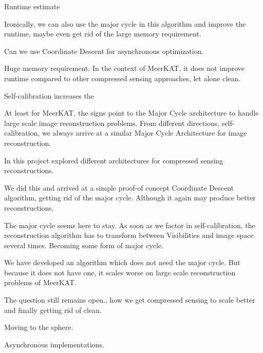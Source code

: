 Runtime estimate

Ironically, we can also use the major cycle in this algorithm and improve the runtime, maybe even get rid of the large memory requirement.

Can we use Coordinate Descent for asynchronous optimization.

Huge memory requirement. In the context of MeerKAT, it does not improve runtime compared to other compressed sensing approaches, let alone clean.

Self-calibration increases the 

At least for MeerKAT, the signs point to the Major Cycle architecture to handle large scale image reconstruction problems. From different directions, self-calibration, we always arrive at a similar Major Cycle Architecture for image reconstruction.






In this project explored different architectures for compressed sensing reconstructions. 

We did this and arrived at a simple proof-of concept Coordinate Descent algorithm, getting rid of the major cycle. Although it again may produce better reconstructions,

The major cycle seems here to stay. As soon as we factor in self-calibration, the reconstruction algorithm has to transform between Visibilities and image space several times. Becoming some form of major cycle.

We have developed an algorithm which does not need the major cycle. But because it does not have one, it scales worse on large scale reconstruction problems of MeerKAT.

The question still remains open., how we get compressed sensing to scale better and finally getting rid of clean. 

Moving to the sphere.

Asynchronous implementations.
 
